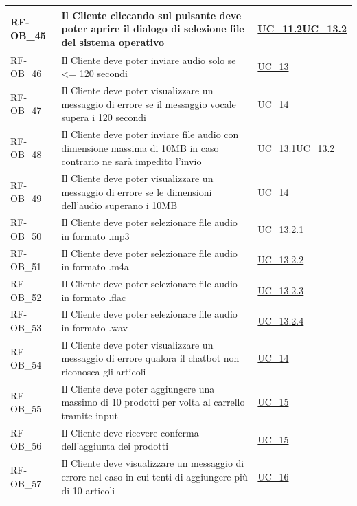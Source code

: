 \begin{longtable}{|>{\raggedright}p{}|>{\raggedright\arraybackslash}p{}|>{\raggedright\arraybackslash}p{}|}
	\hline
	RF-OB\_45 \hypertarget{rf-ob_45} & Il Cliente cliccando sul pulsante deve poter aprire il dialogo di selezione file del sistema operativo & \hyperref[uc_11.2]{UC\_11.2}\newline \hyperref[uc_13.2]{UC\_13.2} \\
	\hline
	RF-OB\_46 \hypertarget{rf-ob_46} & Il Cliente deve poter inviare audio solo se <= 120 secondi & \hyperref[uc_13]{UC\_13} \\
	\hline
	RF-OB\_47 \hypertarget{rf-ob_47} & Il Cliente deve poter visualizzare un messaggio di errore se il messaggio vocale supera i 120 secondi & \hyperref[uc_14]{UC\_14} \\
	\hline
	RF-OB\_48 \hypertarget{rf-ob_48} & Il Cliente deve poter inviare file audio con dimensione massima di 10MB in caso contrario ne sarà impedito l'invio & \hyperref[uc_13.1]{UC\_13.1}\newline \hyperref[uc_13.2]{UC\_13.2} \\
	\hline
	RF-OB\_49 \hypertarget{rf-ob_49} & Il Cliente deve poter visualizzare un messaggio di errore se le dimensioni dell'audio superano i 10MB & \hyperref[uc_14]{UC\_14} \\
	\hline
	RF-OB\_50 \hypertarget{rf-ob_50} & Il Cliente deve poter selezionare file audio in formato .mp3 & \hyperref[uc_13.2.1]{UC\_13.2.1}\\
	\hline
	RF-OB\_51 \hypertarget{rf-ob_51} & Il Cliente deve poter selezionare file audio in formato .m4a & \hyperref[uc_13.2.2]{UC\_13.2.2} \\
	\hline
	RF-OB\_52 \hypertarget{rf-ob_52} & Il Cliente deve poter selezionare file audio in formato .flac & \hyperref[uc_13.2.3]{UC\_13.2.3} \\
	\hline
	RF-OB\_53 \hypertarget{rf-ob_53} & Il Cliente deve poter selezionare file audio in formato .wav & \hyperref[uc_13.2.4]{UC\_13.2.4} \\
	\hline
	RF-OB\_54 \hypertarget{rf-ob_54} & Il Cliente deve poter visualizzare un messaggio di errore qualora il chatbot non riconosca gli articoli & \hyperref[uc_14]{UC\_14} \\
	\hline
	RF-OB\_55 \hypertarget{rf-ob_55} & Il Cliente deve poter aggiungere una massimo di 10 prodotti per volta al carrello tramite input & \hyperref[uc_15]{UC\_15} \\
	\hline
	RF-OB\_56 \hypertarget{rf-ob_56} & Il Cliente deve ricevere conferma dell'aggiunta dei prodotti & \hyperref[uc_15]{UC\_15} \\
	\hline
	RF-OB\_57 \hypertarget{rf-ob_57} & Il Cliente deve visualizzare un messaggio di errore nel caso in cui tenti di aggiungere più di 10 articoli & \hyperref[uc_16]{UC\_16} \\

\end{longtable}
